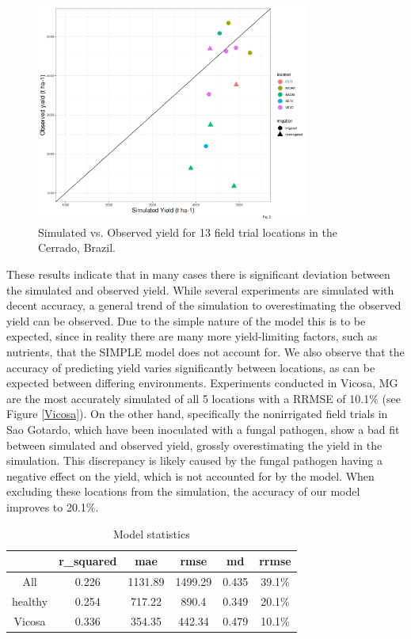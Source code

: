 \documentclass[a4paper,12pt,oneside]{article}
\begin{document}
\begin{figure}[htbp]
\centering
\includegraphics[width=0.8\textwidth]{../results/experimental-data/2023-02-18_Obs_Sim_all_415.png}
\caption{\label{obs-sim}Simulated vs. Observed yield for 13 field trial locations in the Cerrado, Brazil.}
\end{figure}

These results indicate that in many cases there is significant deviation between the simulated and observed yield. While several experiments are simulated with decent accuracy, a general trend of the simulation to overestimating the observed yield can be observed. Due to the simple nature of the model this is to be expected, since in reality there are many more yield-limiting factors, such as nutrients, that the SIMPLE model does not account for.
We also observe that the accuracy of predicting yield varies significantly between locations, as can be expected between differing environments. Experiments conducted in Vicosa, MG are the most accurately simulated of all 5 locations with a RRMSE of 10.1\% (see Figure \ref{Vicosa}).
On the other hand, specifically the nonirrigated field trials in Sao Gotardo, which  have been inoculated with a fungal pathogen, show a bad fit between simulated and observed yield, grossly overestimating the yield in the simulation. This discrepancy is likely caused by the fungal pathogen having a negative effect on the yield, which is not accounted for by the model. When excluding these locations from the simulation, the accuracy of our model improves to 20.1\%.

\begin{table}[htbp]
\caption{\label{stats}Model statistics}
\centering
\begin{tabular}{|c|c|c|c|c|c|}
\hline
 & r\_squared & mae & rmse & md & rrmse\\
\hline
All & 0.226 & 1131.89 & 1499.29 & 0.435 & 39.1\%\\
healthy & 0.254 & 717.22 & 890.4 & 0.349 & 20.1\%\\
Vicosa & 0.336 & 354.35 & 442.34 & 0.479 & 10.1\%\\
\hline
\end{tabular}
\end{table}
\end{document}

